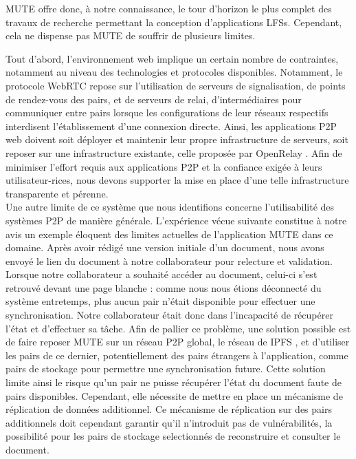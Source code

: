 \ac{MUTE} offre donc, à notre connaissance, le tour d'horizon le plus complet des travaux de recherche permettant la conception d'applications \acp{LFS}.
Cependant, cela ne dispense pas \ac{MUTE} de souffrir de plusieurs limites.

Tout d'abord, l'environnement web implique un certain nombre de contraintes, notamment au niveau des technologies et protocoles disponibles.
Notamment, le protocole WebRTC repose sur l'utilisation de serveurs de signalisation, \ie de points de rendez-vous des pairs, et de serveurs de relai, \ie d'intermédiaires pour communiquer entre pairs lorsque les configurations de leur réseaux respectifs interdisent l'établissement d'une connexion directe.
Ainsi, les applications \ac{P2P} web doivent soit déployer et maintenir leur propre infrastructure de serveurs, soit reposer sur une infrastructure existante, \eg celle proposée par OpenRelay \cite{openrelay}.
Afin de minimiser l'effort requis aux applications \ac{P2P} et la confiance exigée à leurs utilisateur-rices, nous devons supporter la mise en place d'une telle infrastructure transparente et pérenne.\\

Une autre limite de ce système que nous identifions concerne l'utilisabilité des systèmes \ac{P2P} de manière générale.
L'expérience vécue suivante constitue à notre avis un exemple éloquent des limites actuelles de l'application \ac{MUTE} dans ce domaine.
Après avoir rédigé une version initiale d'un document, nous avons envoyé le lien du document à notre collaborateur pour relecture et validation.
Lorsque notre collaborateur a souhaité accéder au document, celui-ci s'est retrouvé devant une page blanche : comme nous nous étions déconnecté du système entretemps, \ie plus aucun pair n'était disponible pour effectuer une synchronisation.
Notre collaborateur était donc dans l'incapacité de récupérer l'état et d'effectuer sa tâche.
Afin de pallier ce problème, une solution possible est de faire reposer \ac{MUTE} sur un réseau \ac{P2P} global, \eg le réseau de \ac{IPFS} \cite{ipfs}, et d'utiliser les pairs de ce dernier, potentiellement des pairs étrangers à l'application, comme pairs de stockage pour permettre une synchronisation future.
Cette solution limite ainsi le risque qu'un pair ne puisse récupérer l'état du document faute de pairs disponibles.
Cependant, elle nécessite de mettre en place un mécanisme de réplication de données additionnel.
Ce mécanisme de réplication sur des pairs additionnels doit cependant garantir qu'il n'introduit pas de vulnérabilités, \eg la possibilité pour les pairs de stockage selectionnés de reconstruire et consulter le document.
